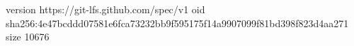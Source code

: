 version https://git-lfs.github.com/spec/v1
oid sha256:4e47bcddd07581e6fca73232bb9f595175f14a9907099f81bd398f823d4aa271
size 10676
